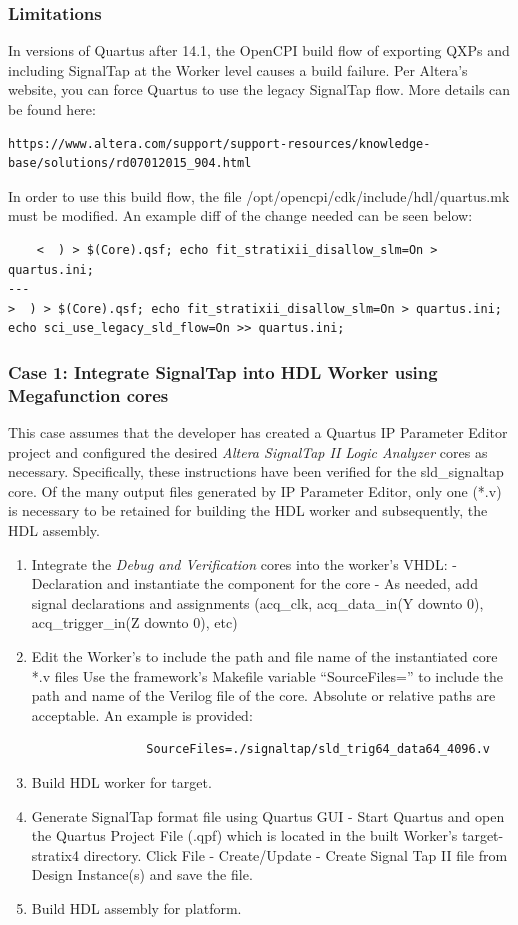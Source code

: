 \begin{flushleft}
	\subsubsection{Limitations}
	In versions of Quartus after 14.1, the OpenCPI build flow of exporting QXPs and including SignalTap at the Worker level causes a build failure. Per Altera's website, you can force Quartus to use the legacy SignalTap flow. More details can be found here: \begin{verbatim}https://www.altera.com/support/support-resources/knowledge-base/solutions/rd07012015_904.html\end{verbatim}
	In order to use this build flow, the file /opt/opencpi/cdk/include/hdl/quartus.mk must be modified. An example diff of the change needed can be seen below:
	\scriptsize\begin{verbatim}
	<  ) > $(Core).qsf; echo fit_stratixii_disallow_slm=On > quartus.ini;
---
>  ) > $(Core).qsf; echo fit_stratixii_disallow_slm=On > quartus.ini; echo sci_use_legacy_sld_flow=On >> quartus.ini;
	\end{verbatim}\normalsize
	\subsubsection{Case 1: Integrate SignalTap into HDL Worker using Megafunction cores}
	This case assumes that the developer has created a Quartus IP Parameter Editor project and configured the desired \textit{Altera SignalTap II Logic Analyzer} cores as necessary. Specifically, these instructions have been verified for the sld\_signaltap core. Of the many output files generated by IP Parameter Editor, only one (*.v) is necessary to be retained for building the HDL worker and subsequently, the HDL assembly.
		\begin{enumerate}
			\item Integrate the \textit{Debug and Verification} cores into the worker's VHDL:
				\subitem - Declaration and instantiate the component for the core
				\subitem - As needed, add signal declarations and assignments (acq\_clk, acq\_data\_in(Y downto 0), acq\_trigger\_in(Z downto 0), etc)
			\item Edit the Worker's  to include the path and file name of the instantiated core *.v files Use the framework's Makefile variable ``SourceFiles='' to include the path and	name of the Verilog file of the core. Absolute or relative paths are acceptable. An example is provided:
			\small\begin{verbatim}
				SourceFiles=./signaltap/sld_trig64_data64_4096.v
			\end{verbatim}
		 	\item Build HDL worker for target.
		 	\item Generate SignalTap format file using Quartus GUI
		 		\subitem - Start Quartus and open the Quartus Project File (.qpf) which is located in the built Worker's target-stratix4 directory. Click File - Create/Update - Create Signal Tap II file from Design Instance(s) and save the file.
			\item Build HDL assembly for platform.
		\end{enumerate}


\end{flushleft}
